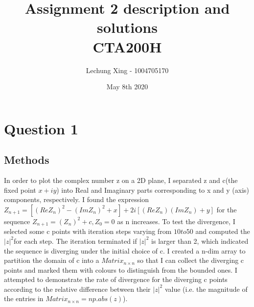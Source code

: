 \documentclass{article}
\title{Assignment 2 description and solutions \\ CTA200H}
\author{Lechung Xing - 1004705170 }
\date{May 8th 2020}
\begin{document}
\maketitle

\section{Question 1}
\subsection{Methods}
In order to plot the complex number z on a 2D plane, I separated z and c(the fixed point $x + iy$) into Real and Imaginary parts corresponding to x and y (axis) components, respectively. I found the expression \(Z_{n+1}= [(ReZ_n)^2-(ImZ_n)^2+x] + 2i[(ReZ_n)(ImZ_n) + y]\) for the sequence \(Z_{n+1} = (Z_n)^2 + c, Z_0 = 0\) as n increases. To test the divergence, I selected some c points with iteration steps varying from $10 to 50$ and computed the \(|z|^2\)for each step. The iteration terminated if \(|z|^2\) is larger than 2, which indicated the sequence is diverging under the initial choice of c. I created a n-dim array to partition the domain of c into a \(Matrix_{n\times{n}}\) so that I can collect the diverging c points and marked them with colours to distinguish from the bounded ones. I attempted to demonstrate the rate of divergence for the diverging c points according to the relative difference between their  \(|z|^2\) value (i.e. the magnitude of the entries in \(Matrix_{n\times{n}} = np.abs(z)\)).
\end{document}
